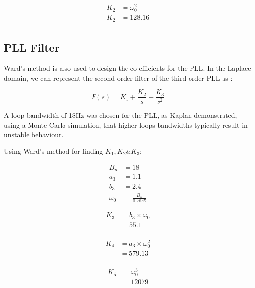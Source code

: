 \begin{equation} \label{eq2}
\begin{split}
K_2 & = \omega_{0}^2\\
K_2 & = 128.16\\
\end{split}
\end{equation}

\subsection{\ac{PLL} Filter}
Ward's method is also used to design the co-efficients for the \ac{PLL}. In the Laplace domain, we can represent the second order filter  of the third order \ac{PLL} as : 

\begin{equation} \label{eq6}
F(s) = K_1 + \frac{K_2}{s} + \frac{K_3}{s^2}
\end{equation}

A loop bandwidth of 18Hz was chosen for the \ac{PLL}, as Kaplan\cite{Kaplan} demonstrated, using a Monte Carlo simulation, that higher loops bandwidths typically result in unstable behaviour. 

Using Ward's method\cite{Ward} for finding $K_1,K_2\&K_3$:

\begin{align*}
B_n &= 18\\
a_3&=1.1\\
b_3&=2.4\\
\omega_{0}&=\frac{B_n}{0.7845}
\end{align*}

\begin{equation} \label{eq3}
\begin{split}
K_3 & = b_3 \times \omega_{0}\\
    & = 55.1\\
\end{split}
\end{equation}

\begin{equation} \label{eq4}
\begin{split}
K_4 & = a_3 \times \omega_{0}^2\\ 
    & = 579.13\\
\end{split}
\end{equation}

\begin{equation} \label{eq5}
\begin{split}
K_5 & = \omega_{0}^3\\
    & = 12079\\
\end{split}
\end{equation}


